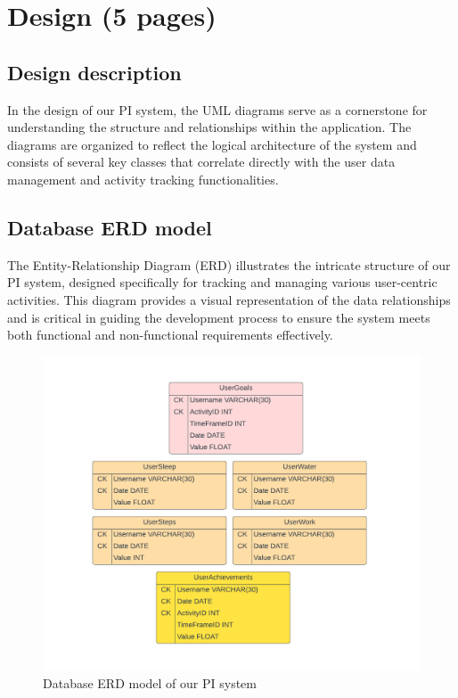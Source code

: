 \documentclass[12pt]{article}
\begin{document}
\newpage
\section{Design (5 pages)}
\subsection{Design description}

In the design of our PI system, the UML diagrams serve as a cornerstone for
understanding the structure and relationships within the application. The
diagrams are organized to reflect the logical architecture of the system and
consists of several key classes that correlate directly with the user data
management and activity tracking functionalities.\par

\subsection{Database ERD model}

The Entity-Relationship Diagram (ERD) illustrates the intricate structure of
our PI system, designed specifically for tracking and managing various
user-centric activities. This diagram provides a visual representation of the
data relationships and is critical in guiding the development process to ensure
the system meets both functional and non-functional requirements
effectively.\par


\begin{figure}[!ht]
  \centering
  \includegraphics[width = \linewidth]{PI Systems Database}
  \caption{Database ERD model of our PI system}
  \label{fig:PI_ERD}
\end{figure}
\end{document}
